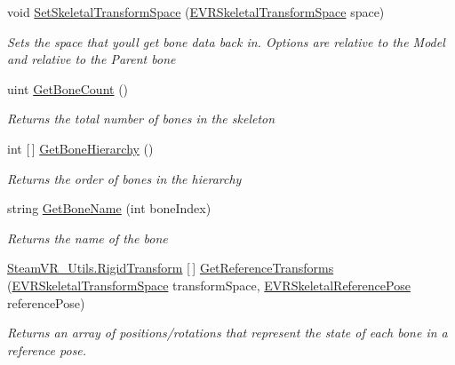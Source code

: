 \begin{DoxyCompactItemize}
void \mbox{\hyperlink{class_valve_1_1_v_r_1_1_steam_v_r___action___skeleton_a4cc01960830d09746b0b5b6f43dfc8ab}{Set\+Skeletal\+Transform\+Space}} (\mbox{\hyperlink{namespace_valve_1_1_v_r_a916744fb3fc7b8e8ba224fba9bee6de4}{E\+V\+R\+Skeletal\+Transform\+Space}} space)
\begin{DoxyCompactList}\small\item\em Sets the space that you\textquotesingle{}ll get bone data back in. Options are relative to the Model and relative to the Parent bone \end{DoxyCompactList}\item 
uint \mbox{\hyperlink{class_valve_1_1_v_r_1_1_steam_v_r___action___skeleton_aec0391bff41788a0f69886ac6299e310}{Get\+Bone\+Count}} ()
\begin{DoxyCompactList}\small\item\em Returns the total number of bones in the skeleton \end{DoxyCompactList}\item 
int \mbox{[}$\,$\mbox{]} \mbox{\hyperlink{class_valve_1_1_v_r_1_1_steam_v_r___action___skeleton_ae0ccc65c036c7bf1685362aa92392c5b}{Get\+Bone\+Hierarchy}} ()
\begin{DoxyCompactList}\small\item\em Returns the order of bones in the hierarchy \end{DoxyCompactList}\item 
string \mbox{\hyperlink{class_valve_1_1_v_r_1_1_steam_v_r___action___skeleton_a7d77b9fd5ed9b996ebdca5ba40a811a7}{Get\+Bone\+Name}} (int bone\+Index)
\begin{DoxyCompactList}\small\item\em Returns the name of the bone \end{DoxyCompactList}\item 
\mbox{\hyperlink{struct_valve_1_1_v_r_1_1_steam_v_r___utils_1_1_rigid_transform}{Steam\+V\+R\+\_\+\+Utils.\+Rigid\+Transform}} \mbox{[}$\,$\mbox{]} \mbox{\hyperlink{class_valve_1_1_v_r_1_1_steam_v_r___action___skeleton_a456a63483d7225b1618ccc5d6757bee5}{Get\+Reference\+Transforms}} (\mbox{\hyperlink{namespace_valve_1_1_v_r_a916744fb3fc7b8e8ba224fba9bee6de4}{E\+V\+R\+Skeletal\+Transform\+Space}} transform\+Space, \mbox{\hyperlink{namespace_valve_1_1_v_r_a299b655881f873256f035349b59da09e}{E\+V\+R\+Skeletal\+Reference\+Pose}} reference\+Pose)
\begin{DoxyCompactList}\small\item\em Returns an array of positions/rotations that represent the state of each bone in a reference pose. \end{DoxyCompactList}\item 

\end{DoxyCompactItemize}
